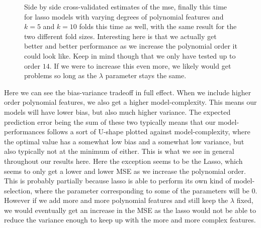 \documentclass{article}
\begin{document}
\begin{figure}
    \centering
    \quad
    \caption{Side by side cross-validated estimates of the mse, finally this time for lasso models with varying degrees of polynomial features and $k=5$ and
        $k=10$ folds this time as well, with the same result for the two
        different fold sizes. Interesting here is that we actually get better
        and better performance as we increase the polynomial order it could look
        like. Keep in mind though that we only have tested up to order $14$. If
        we were to increase this even more, we likely would get problems so long
        as the $\lambda$ parameter stays the same.}
    \label{crossval-lasso}
\end{figure}

Here we can see the bias-variance tradeoff in full effect. When we include
higher order polynomial features, we also get a higher model-complexity. This
means our models will have lower bias, but also much higher variance. The
expected prediction error being the sum of these two typically means that our
model-performances follows a sort of U-shape plotted against model-complexity,
where the optimal value has a somewhat low bias and a somewhat low variance, but
also typically not at the minimum of either. This is what we see in general
throughout our results here. Here the exception seems to be the Lasso, which
seems to only get a lower and lower MSE as we increase the polynomial order.
This is probably partially because lasso is able to perform its own kind of
model-selection, where the parameter corresponding to some of the parameters
will be $0$. However if we add more and more polynomial features and still keep
the $\lambda$ fixed, we would eventually get an increase in the MSE as the lasso
would not be able to reduce the variance enough to keep up with the more and
more complex features.
\end{document}
